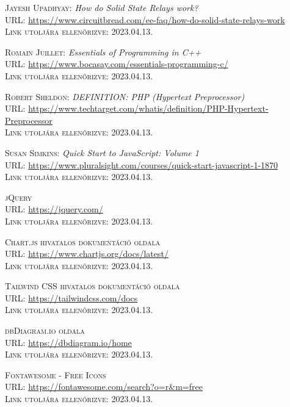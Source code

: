 \documentclass[
]{thesis-ekf}
\theoremstyle{definition}
\theoremstyle{remark}
\begin{document}
\begin{thebibliography}{46}
		\textsc{Jayesh Upadhyay:} \emph{How do Solid State Relays work?}\\
		\textsc{URL:} \url{https://www.circuitbread.com/ee-faq/how-do-solid-state-relays-work}\\
		\textsc{Link utoljára ellenőrizve:} 2023.04.13.
		
		\textsc{Romain Juillet:} \emph{Essentials of Programming in C++}\\
		\textsc{URL:} \url{https://www.bocasay.com/essentials-programming-c/}\\
		\textsc{Link utoljára ellenőrizve:} 2023.04.13.
		
		\textsc{Robert Sheldon:} \emph{DEFINITION: PHP (Hypertext Preprocessor)}\\
		\textsc{URL:} \url{https://www.techtarget.com/whatis/definition/PHP-Hypertext-Preprocessor}\\
		\textsc{Link utoljára ellenőrizve:} 2023.04.13.
		
		\textsc{Susan Simkins:} \emph{Quick Start to JavaScript: Volume 1}\\
		\textsc{URL:} \url{https://www.pluralsight.com/courses/quick-start-javascript-1-1870}\\
		\textsc{Link utoljára ellenőrizve:} 2023.04.13.
		
		\textsc{jQuery}\\
		\textsc{URL:} \url{https://jquery.com/}\\
		\textsc{Link utoljára ellenőrizve:} 2023.04.13.
		
		\textsc{Chart.js hivatalos dokumentáció oldala}\\
		\textsc{URL:} \url{https://www.chartjs.org/docs/latest/}\\
		\textsc{Link utoljára ellenőrizve:} 2023.04.13.
		
		\textsc{Tailwind CSS hivatalos dokumentáció oldala}\\
		\textsc{URL:} \url{https://tailwindcss.com/docs}\\
		\textsc{Link utoljára ellenőrizve:} 2023.04.13.
		
		\textsc{dbDiagram.io oldala}\\
		\textsc{URL:} \url{https://dbdiagram.io/home}\\
		\textsc{Link utoljára ellenőrizve:} 2023.04.13.
		
		\textsc{Fontawesome - Free Icons}\\
		\textsc{URL:} \url{https://fontawesome.com/search?o=r&m=free}\\
		\textsc{Link utoljára ellenőrizve:} 2023.04.13.
		

\end{thebibliography}
\end{document}
